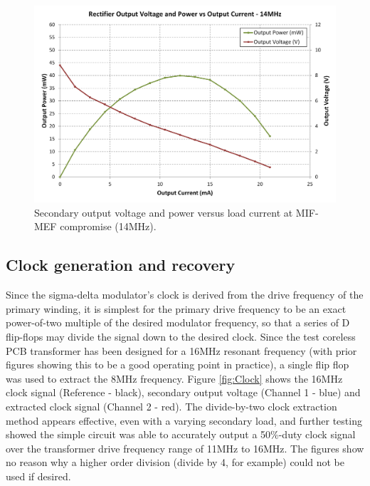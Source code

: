 \documentclass[conference]{IEEEtran}
\begin{document}
	\begin{figure}[t]
		\centering
		\includegraphics[width=1\columnwidth]{./img/VandPvsI_retuned}
		\caption{Secondary output voltage and power versus load current at MIF-MEF compromise (14MHz).}
		\label{fig:VanndPvsI_retuned}
	\end{figure}
	
	\subsection{Clock generation and recovery}
	Since the sigma-delta modulator's clock is derived from the drive frequency of the primary winding, it is simplest for the primary drive frequency to be an exact power-of-two multiple of the desired modulator frequency, so that a series of D flip-flops may divide the signal down to the desired clock.  Since the test coreless PCB transformer has been designed for a 16MHz resonant frequency (with prior figures showing this to be a good operating point in practice), a single flip flop was used to extract the 8MHz frequency.  Figure \ref{fig:Clock} shows the 16MHz clock signal (Reference - black), secondary output voltage (Channel 1 - blue) and extracted clock signal (Channel 2 - red).  The divide-by-two clock extraction method appears effective, even with a varying secondary load, and further testing showed the simple circuit was able to accurately output a 50\%-duty clock signal over the transformer drive frequency range of 11MHz to 16MHz.  The figures show no reason why a higher order division (divide by 4, for example) could not be used if desired.
	
\end{document}
